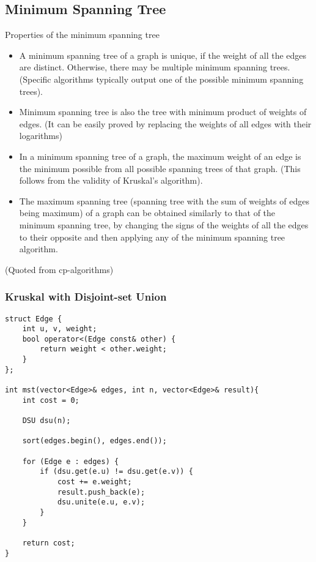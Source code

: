 \documentclass{article}
\begin{document}
\subsection{Minimum Spanning Tree}
Properties of the minimum spanning tree
\begin{itemize}
    \item A minimum spanning tree of a graph is unique, if the weight of all the edges are distinct. Otherwise, there may be multiple minimum spanning trees. (Specific algorithms typically output one of the possible minimum spanning trees).
    \item Minimum spanning tree is also the tree with minimum product of weights of edges. (It can be easily proved by replacing the weights of all edges with their logarithms)
    \item In a minimum spanning tree of a graph, the maximum weight of an edge is the minimum possible from all possible spanning trees of that graph. (This follows from the validity of Kruskal's algorithm).
    \item The maximum spanning tree (spanning tree with the sum of weights of edges being maximum) of a graph can be obtained similarly to that of the minimum spanning tree, by changing the signs of the weights of all the edges to their opposite and then applying any of the minimum spanning tree algorithm.
\end{itemize}

(Quoted from cp-algorithms)
\subsubsection{Kruskal with Disjoint-set Union}
\begin{verbatim}
struct Edge {
    int u, v, weight;
    bool operator<(Edge const& other) {
        return weight < other.weight;
    }
};

int mst(vector<Edge>& edges, int n, vector<Edge>& result){
    int cost = 0;

    DSU dsu(n);

    sort(edges.begin(), edges.end());

    for (Edge e : edges) {
        if (dsu.get(e.u) != dsu.get(e.v)) {
            cost += e.weight;
            result.push_back(e);
            dsu.unite(e.u, e.v);
        }
    }

    return cost;
}


\end{verbatim}
\end{document}

